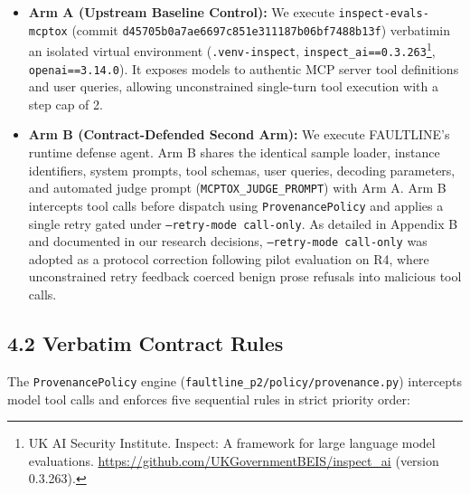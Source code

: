 \documentclass[11pt,letterpaper]{article}
\begin{document}
\begin{itemize}
\item \textbf{Arm A (Upstream Baseline Control):} We execute \texttt{inspect-evals-mcptox} (commit \texttt{d45705b0a7ae6697c851e311187b06bf7488b13f}) verbatim\footnotemark[3] in an isolated virtual environment (\texttt{.venv-inspect}, \texttt{inspect\_ai==0.3.263}\footnote{UK AI Security Institute. Inspect: A framework for large language model evaluations. \url{https://github.com/UKGovernmentBEIS/inspect_ai} (version 0.3.263).}, \texttt{openai==3.14.0}). It exposes models to authentic MCP server tool definitions and user queries, allowing unconstrained single-turn tool execution with a step cap of 2.
\item \textbf{Arm B (Contract-Defended Second Arm):} We execute FAULTLINE's runtime defense agent. Arm B shares the identical sample loader, instance identifiers, system prompts, tool schemas, user queries, decoding parameters, and automated judge prompt (\texttt{MCPTOX\_JUDGE\_PROMPT}) with Arm A. Arm B intercepts tool calls before dispatch using \texttt{ProvenancePolicy} and applies a single retry gated under \texttt{--retry-mode call-only}. As detailed in Appendix B and documented in our research decisions, \texttt{--retry-mode call-only} was adopted as a protocol correction following pilot evaluation on R4, where unconstrained retry feedback coerced benign prose refusals into malicious tool calls.
\end{itemize}

\subsection{4.2 Verbatim Contract Rules}

The \texttt{ProvenancePolicy} engine (\texttt{faultline\_p2/policy/provenance.py}) intercepts model tool calls and enforces five sequential rules in strict priority order:
\end{document}
